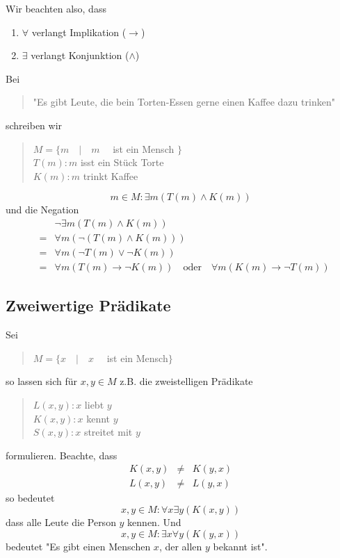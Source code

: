 \documentclass{report}
\begin{document}
Wir beachten also, dass
\begin{enumerate} \item $\forall$ verlangt Implikation ($\to$)
\item $\exists$ verlangt Konjunktion ($\land$)\end{enumerate}
Bei
\begin{quote}"Es gibt Leute, die bein Torten-Essen gerne einen Kaffee dazu trinken"\end{quote}
schreiben wir
\begin{quote}$M = \{ m \quad | \quad m \quad$ ist ein Mensch $\}$\\
$T(m) : m$ isst ein Stück Torte\\
$K(m) : m$ trinkt Kaffee\end{quote}
\begin{equation}m \in M : \exists m (T(m) \land K(m))\end{equation}
und die Negation
\begin{eqnarray}& &\lnot \exists m (T(m) \land K(m)) \nonumber \\
&=& \forall m (\lnot (T(m) \land K(m))) \nonumber \\
&=& \forall m (\lnot T(m) \lor \lnot K(m)) \nonumber \\
&=& \forall m (T(m) \to \lnot K(m)) \quad \mbox{oder} \quad \forall m (K(m) \to \lnot T(m)) \end{eqnarray}
\subsection{Zweiwertige Prädikate}
Sei
\begin{quote}$M = \{x \quad | \quad x \quad$ ist ein Mensch$\}$\end{quote}
so lassen sich für $x,y \in M$ z.B. die zweistelligen Prädikate
\begin{quote}$L(x,y) : x$ liebt $y$\\
$K(x,y) : x$ kennt $y$\\
$S(x,y) : x$ streitet mit $y$\end{quote}
formulieren. Beachte, dass
\begin{eqnarray}K(x,y) & \neq & K(y,x)\nonumber \\
L(x,y) & \neq & L(y,x)\end{eqnarray}
so bedeutet
\begin{equation}x,y \in M : \forall x \exists y (K(x,y))\end{equation}
dass alle Leute die Person $y$ kennen. Und
\begin{equation}x,y \in M : \exists x \forall y (K(y,x))\end{equation}
bedeutet "Es gibt einen Menschen $x$, der allen $y$ bekannt ist".
\end{document}

